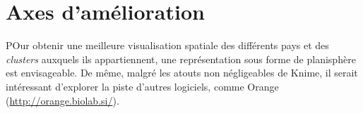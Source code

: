 \section{Axes d'amélioration}

POur obtenir une meilleure visualisation spatiale des différents
pays et des {\sl clusters} auxquels ils appartiennent, une représentation
sous forme de planisphère est envisageable.
De même, malgré les atouts non négligeables de Knime, il serait intéressant
d'explorer la piste d'autres logiciels, comme Orange (\url{http://orange.biolab.si/}).

